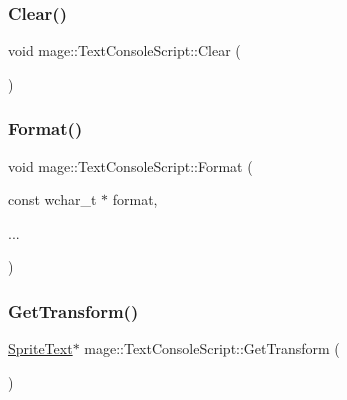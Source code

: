 \subsubsection{\texorpdfstring{Clear()}{Clear()}}
{\footnotesize\ttfamily void mage\+::\+Text\+Console\+Script\+::\+Clear (\begin{DoxyParamCaption}{ }\end{DoxyParamCaption})}

\hypertarget{classmage_1_1_text_console_script_a4d9ba97e4ff4ad5390b20e5523a20e92}{}\label{classmage_1_1_text_console_script_a4d9ba97e4ff4ad5390b20e5523a20e92} 
\subsubsection{\texorpdfstring{Format()}{Format()}}
{\footnotesize\ttfamily void mage\+::\+Text\+Console\+Script\+::\+Format (\begin{DoxyParamCaption}\item[{const wchar\+\_\+t $\ast$}]{format,  }\item[{}]{... }\end{DoxyParamCaption})}

\hypertarget{classmage_1_1_text_console_script_a4ca556738d1a1892944c6973442c4d22}{}\label{classmage_1_1_text_console_script_a4ca556738d1a1892944c6973442c4d22} 
\subsubsection{\texorpdfstring{Get\+Transform()}{GetTransform()}\hspace{0.1cm}{\footnotesize\ttfamily [1/2]}}
{\footnotesize\ttfamily \hyperlink{classmage_1_1_sprite_text}{Sprite\+Text}$\ast$ mage\+::\+Text\+Console\+Script\+::\+Get\+Transform (\begin{DoxyParamCaption}{ }\end{DoxyParamCaption})}

\hypertarget{classmage_1_1_text_console_script_a8c65fa13d8c56b15c63ce918439c2669}{}\label{classmage_1_1_text_console_script_a8c65fa13d8c56b15c63ce918439c2669} 
